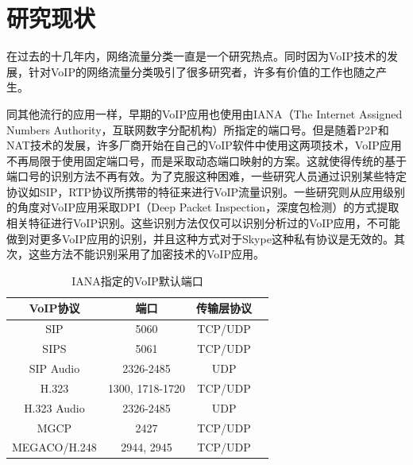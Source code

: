 
\section{研究现状}
在过去的十几年内，网络流量分类一直是一个研究热点。同时因为VoIP技术的发展，针对VoIP的网络流量分类吸引了很多研究者，许多有价值的工作也随之产生。

同其他流行的应用一样，早期的VoIP应用也使用由IANA（The Internet Assigned Numbers Authority，互联网数字分配机构）所指定的端口号。但是随着P2P和NAT技术的发展，许多厂商开始在自己的VoIP软件中使用这两项技术，VoIP应用不再局限于使用固定端口号，而是采取动态端口映射的方案。这就使得传统的基于端口号的识别方法不再有效。为了克服这种困难，一些研究人员\supercite{14, 16}通过识别某些特定协议如SIP，RTP协议所携带的特征来进行VoIP流量识别。一些研究\supercite{18}则从应用级别的角度对VoIP应用采取DPI（Deep Packet Inspection，深度包检测）的方式提取相关特征进行VoIP识别。这些识别方法仅仅可以识别分析过的VoIP应用，不可能做到对更多VoIP应用的识别，并且这种方式对于Skype这种私有协议是无效的。其次，这些方法不能识别采用了加密技术的VoIP应用。

\begin{table} [thb]
\caption{IANA指定的VoIP默认端口}\label{tab:21}
\small
\centering
{
\begin{tabular}{cccc}
  \toprule
        VoIP协议 & 端口 & 传输层协议 \\
  \midrule
        SIP & 5060 & TCP/UDP \\
        SIPS & 5061 & TCP/UDP \\
        SIP Audio & 2326-2485 & UDP\\
        H.323 & 1300, 1718-1720 & TCP/UDP\\
        H.323 Audio & 2326-2485 & UDP\\
        MGCP & 2427 & TCP/UDP\\
        MEGACO/H.248 & 2944, 2945 & TCP/UDP\\
 \bottomrule
\end{tabular}
}
\end{table}

